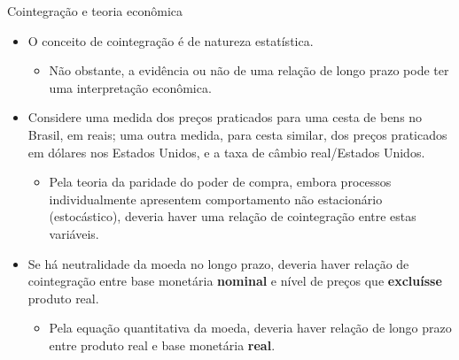 \documentclass[11pt]{beamer}
\begin{document}
\begin{frame}{Cointegração e teoria econômica}
	\begin{itemize}
		\item O conceito de cointegração é de natureza estatística.
		\begin{itemize}
			\item Não obstante, a evidência ou não de uma relação de longo prazo pode ter uma interpretação econômica.
		\end{itemize}
		\item Considere uma medida dos preços praticados para uma cesta de bens no Brasil, em reais; uma outra medida, para cesta similar, dos preços praticados em dólares nos Estados Unidos, e a taxa de câmbio real/Estados Unidos.
		\begin{itemize}
		\item  {\color{blue}Pela teoria da paridade do poder de compra}, embora processos individualmente apresentem comportamento não estacionário (estocástico), deveria haver uma relação de cointegração entre estas variáveis.
		\end{itemize}
		
		\item {\color{blue}Se há neutralidade da moeda no longo prazo}, deveria haver relação de cointegração entre base monetária \textbf{nominal} e nível de preços que \textbf{excluísse} produto real.
		\begin{itemize}
			\item Pela equação quantitativa da moeda, deveria haver relação de longo prazo entre produto real e base monetária \textbf{real}.
		\end{itemize}
	
		
	\end{itemize}
\end{frame}
\end{document}

